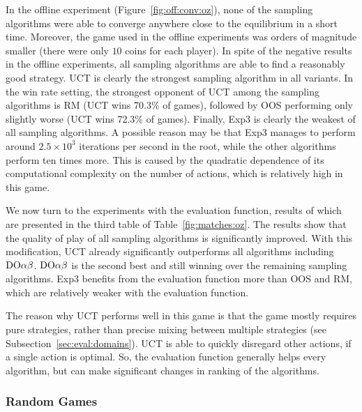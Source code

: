 In the offline experiment (Figure~\ref{fig:off:conv:oz}), none of the sampling algorithms were able to converge anywhere close to the equilibrium in a short time. Moreover, the game used in the offline experiments was orders of magnitude smaller (there were only $10$ coins for each player).
In spite of the negative results in the offline experiments, all sampling algorithms are able to find a reasonably good strategy.
UCT is clearly the strongest sampling algorithm in all variants.
In the win rate setting, the strongest opponent of UCT among the sampling algorithms is RM (UCT wins 70.3\% of games), followed by OOS performing only slightly worse (UCT wins 72.3\% of games).
Finally, Exp3 is clearly the weakest of all sampling algorithms.
A possible reason may be that Exp3 manages to perform around $2.5 \times 10^3$ iterations per second in the root, while the other algorithms perform ten times more. 
This is caused by the quadratic dependence of its computational complexity on the number of actions, which is relatively high in this game.

We now turn to the experiments with the evaluation function, results of which are presented in the third table of Table~\ref{fig:matches:oz}.
The results show that the quality of play of all sampling algorithms is significantly improved.
With this modification, UCT already significantly outperforms all algorithms including $\textrm{DO}\alpha\beta$.
$\textrm{DO}\alpha\beta$ is the second best and still winning over the remaining sampling algorithms.
Exp3 benefits from the evaluation function more than OOS and RM, which are relatively weaker with the evaluation function.

The reason why UCT performs well in this game is that the game mostly requires pure strategies, rather than precise mixing between multiple strategies (see Subsection~\ref{sec:eval:domains}). UCT is able to quickly disregard other actions, if a single action is optimal.
So, the evaluation function generally helps every algorithm, but can make significant changes in ranking of the algorithms. 

\subsubsection{Random Games}

